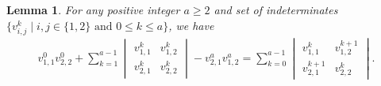 \documentclass[11pt]{amsart}
\newtheorem{lemma}[theorem]{Lemma}
\theoremstyle{remark}
\theoremstyle{remark}
\theoremstyle{definition}
\theoremstyle{definition}
\theoremstyle{definition}
\numberwithin{equation}{section}
\begin{document}
\begin{lemma}\label{pairingdeterminants} For any positive integer $a\geq 2$ and set of indeterminates $\{v_{i,j}^k \mid i,j\in \{1,2\} \text{ and } 0\leq k \leq a \}$, we have
\begin{eqnarray}\label{lem:ident1}
v_{1,1}^0v_{2,2}^0+\displaystyle\sum_{k=1}^{a-1}\begin{vmatrix} v_{1,1}^k&v_{1,2}^k\\v_{2,1}^k&v_{2,2}^k\end{vmatrix}-v_{2,1}^av_{1,2}^a
=\sum_{k=0}^{a-1}\begin{vmatrix}
v_{1,1}^k&v_{1,2}^{k+1}\\
v_{2,1}^{k+1}&v_{2,2}^k
\end{vmatrix}.
\end{eqnarray}
\end{lemma}
\end{document}
